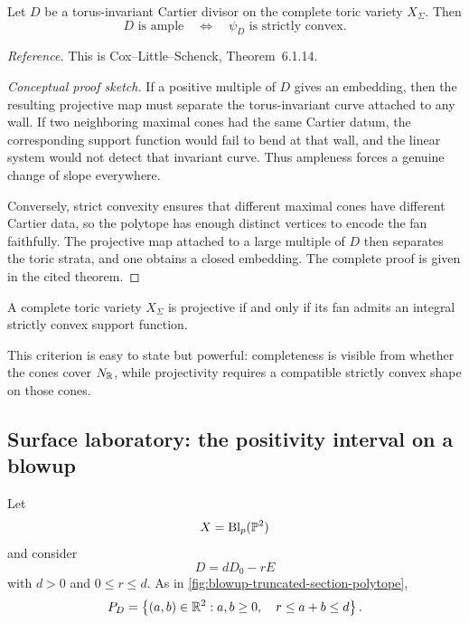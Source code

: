\begin{theorem}
\label{thm:ample-strictly-convex}
Let \(D\) be a torus-invariant Cartier divisor on the complete toric
variety \(X_\Sigma\). Then
\[
\boxed{
D\text{ is ample}
\quad\Longleftrightarrow\quad
\psi_D\text{ is strictly convex}.
}
\]
\end{theorem}

\noindent
\textit{Reference.}
This is Cox--Little--Schenck, Theorem~6.1.14.

\begin{proof}[Conceptual proof sketch]
If a positive multiple of \(D\) gives an embedding, then the resulting
projective map must separate the torus-invariant curve attached to
any wall. If two neighboring maximal cones had the same Cartier
datum, the corresponding support function would fail to bend at that
wall, and the linear system would not detect that invariant curve.
Thus ampleness forces a genuine change of slope everywhere.

Conversely, strict convexity ensures that different maximal cones have
different Cartier data, so the polytope has enough distinct vertices
to encode the fan faithfully. The projective map attached to a large
multiple of \(D\) then separates the toric strata, and one obtains a
closed embedding. The complete proof is given in the cited theorem.
\end{proof}

\begin{corollary}
\label{cor:projective-strict-support-function}
A complete toric variety \(X_\Sigma\) is projective if and only if its
fan admits an integral strictly convex support function.
\end{corollary}

This criterion is easy to state but powerful: completeness is visible
from whether the cones cover \(N_\RR\), while projectivity requires a
compatible strictly convex shape on those cones.

\subsection{Surface laboratory: the positivity interval on a blowup}

Let
\[
X=\Blp{\PP^2}{p}
\]
and consider
\[
D=dD_0-rE
\]
with \(d>0\) and \(0\leq r\leq d\). As in
\cref{fig:blowup-truncated-section-polytope},
\[
P_D
=
\left\{
(a,b)\in\RR^2:
 a,b\geq0,\quad r\leq a+b\leq d
\right\}.
\]

